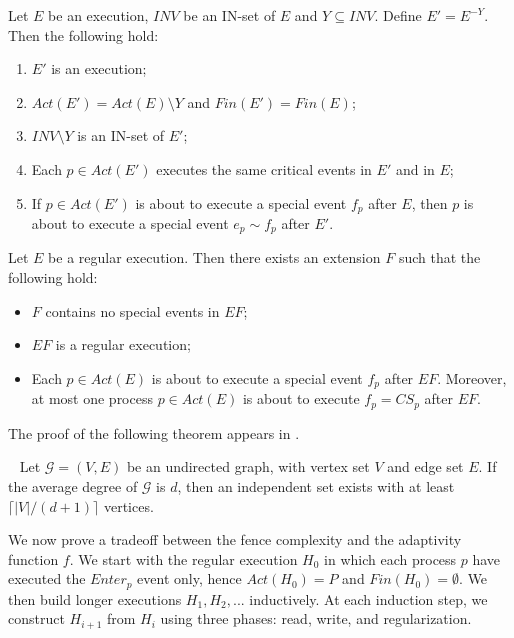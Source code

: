 \begin{lemma} \label{lem: remove-invisibale-processes}
	Let $E$ be an execution, $\mathit{INV}$ be an IN-set of $E$ and $Y \subseteq \mathit{INV}$.
	\newline Define $E' = E^{-Y}$. Then the following hold:
	\begin{enumerate}
		\item $E'$ is an execution;
		\item $Act(E') = Act(E) \setminus Y$ and $Fin(E') = Fin(E)$;
		\item $\mathit{INV} \setminus Y$ is an IN-set of $E'$;
		\item Each $p \in Act(E')$ executes the same critical events in $E'$ and in $E$;
		\item If $p \in Act(E')$ is about to execute a special event $f_p$ after $E$, then $p$ is about to execute a special event $e_p \sim f_p$ after $E'$.
	\end{enumerate}
\end{lemma}

\begin{lemma} \label{lem: next-critical-extension}
	Let $E$ be a regular execution. Then there exists an extension $F$ such that the following hold:
	\begin{itemize}
		\item $F$ contains no special events in $E F$;
		\item $E F$ is a regular execution;
		\item Each $p \in Act(E)$ is about to execute a special event $f_p$ after $E F$. Moreover, at most one process $p \in Act(E)$ is about to execute $f_p=CS_p$ after $E F$.
	\end{itemize}
\end{lemma}

The proof of the following theorem appears in \cite{Bollobas2004}.

\begin{theorem} [Tur\'{a}n] ~\label{th: turan}
	Let $\mathcal{G} = (V,E)$ be an undirected graph, with vertex set $V$ and edge set $E$. If the average degree of $\mathcal{G}$ is $d$, then an independent set exists with at least $\lceil |V|/(d+1) \rceil$ vertices.
\end{theorem}
	
We now prove a tradeoff between the fence complexity and the adaptivity function $f$.
We start with the regular execution $H_0$ in which each process $p$ have executed the $Enter_p$ event only, hence $Act(H_0)=P$ and $Fin(H_0)=\emptyset$. We then build longer executions $H_1,H_2,...$ inductively. At each induction step, we construct $H_{i+1}$ from $H_i$ using three phases: read, write, and regularization.

